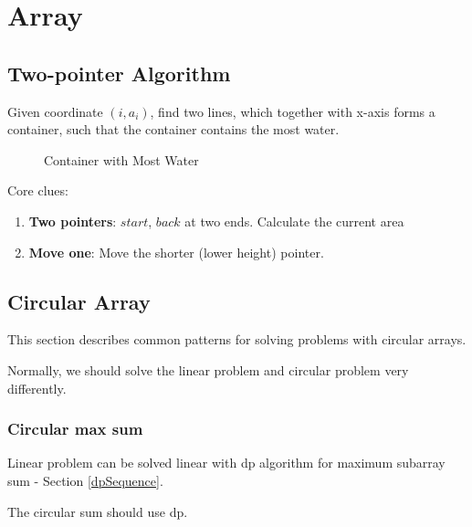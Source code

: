 \chapter{Array}
\section{Two-pointer Algorithm}
 Given coordinate $(i, a_i)$, find two lines, which together with x-axis forms a container, such that the container contains the most water.
\begin{figure}[hbtp]
\centering
{}
\caption{Container with Most Water}
\label{fig:Container-With-Most-Water}
\end{figure}
Core clues:
\begin{enumerate}
\item \textbf{Two pointers}: $start$, $back$ at two ends. Calculate the current area
\item \textbf{Move one}: Move the shorter (lower height) pointer. 
\end{enumerate}

\section{Circular Array}
This section describes common patterns for solving problems with circular arrays.

Normally, we should solve the linear problem and circular problem very differently.

\subsection{Circular max sum}
Linear problem can be solved linear with dp algorithm for maximum subarray sum - Section \ref{dpSequence}. 

The circular sum should use dp. 

